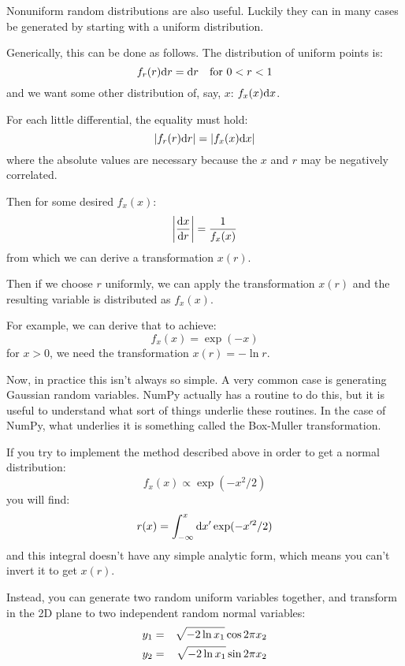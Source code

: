 Nonuniform random distributions are also useful. Luckily they can in
many cases be generated by starting with a uniform distribution. 

Generically, this can be done as follows. The distribution of uniform
points is:
\begin{equation}
f_r(r) {\rm d}r = {\rm d}r \quad \mathrm{for~} 0 < r < 1
\end{equation}
and we want some other distribution of, say, $x$: $f_x(x) {\rm d}x$.

For each little differential, the equality must hold:
\begin{equation}
\left| f_r(r) {\rm d}r \right| = \left|f_x(x) {\rm d}x \right|
\end{equation}
where the absolute values are necessary because the $x$ and $r$ may be
negatively correlated.

Then for some desired $f_x(x)$:
\begin{equation}
\left| \frac{{\rm d}x}{{\rm d}r} \right| = \frac{1}{f_x(x)}
\end{equation}
from which we can derive a transformation $x(r)$.

Then if we choose $r$ uniformly, we can apply the transformation
$x(r)$ and the resulting variable is distributed as $f_x(x)$.

For example, we can derive that to achieve:
\begin{equation}
f_x(x) = \exp(-x)
\end{equation}
for $x>0$, we need the transformation $x(r) = -\ln r$.

Now, in practice this isn't always so simple. A very common case is
generating Gaussian random variables. NumPy actually has a routine to
do this, but it is useful to understand what sort of things underlie
these routines. In the case of NumPy, what underlies it is something
called the Box-Muller transformation.

If you try to implement the method described above in order to get a
normal distribution:
\begin{equation}
f_x(x) \propto \exp\left(-x^2/2\right)
\end{equation}
you will find:
\begin{equation}
r(x) = \int_{-\infty}^{x} {\rm d}x' \exp(-x'^2/2)
\end{equation}
and this integral doesn't have any simple analytic form, which means
you can't invert it to get $x(r)$. 

Instead, you can generate two random uniform variables together, and
transform in the 2D plane to two independent random normal
variables:
\begin{eqnarray}
y_1 &=& \sqrt{-2 \ln x_1} \cos 2\pi x_2 \cr
y_2 &=& \sqrt{-2 \ln x_1} \sin 2\pi x_2
\end{eqnarray}

